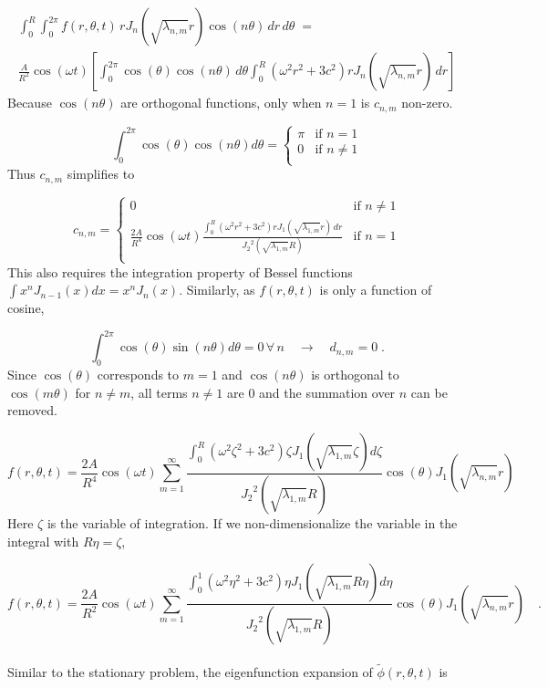 \documentclass{homework}
\begin{document}
\begin{multline*}
\int^R_0 \int^{2 \pi}_0 f(r, \theta , t) \, r J_n (\sqrt{\lambda_{n,m}} r) \cos(n \theta) \, dr \, d \theta \;=\\ \frac{A}{R^2} \cos(\omega t) \left[ \int^{2 \pi}_0 \cos(\theta) \cos(n \theta) \, d \theta \int^R_0 (\omega^2 r^2 + 3c^2)  r J_n (\sqrt{\lambda_{n,m}} r) \, d r \right]
\end{multline*}
\noindent
Because $\cos(n \theta)$ are orthogonal functions, only when $n = 1$ is $c_{n,m}$ non-zero.

\[ \int^{2 \pi}_0 \cos(\theta) \cos(n \theta) d \theta = 
\begin{cases}
      \pi & \text{if $n=1$}\\
      0 & \text{if $n \neq 1$}\\
    \end{cases}
\]
\noindent
Thus $c_{n,m}$ simplifies to 

\[ c_{n,m} = 
\begin{cases}
      0 & \text{if $n \neq 1$}\\
      \frac{2A}{R^4} \cos(\omega t) \frac{\int^R_0 (\omega^2 r^2 + 3c^2)  r J_1 (\sqrt{\lambda_{1,m}} r) \, d r}{{J_2}^2 (\sqrt{\lambda_{1,m}} R) } & \text{if $n = 1$}\\
    \end{cases}
\]
\noindent
This also requires the integration property of Bessel functions $\int x^n J_{n-1}(x) dx = x^n J_n(x)$. Similarly, as $f(r, \theta, t)$ is only a function of cosine, 

\[ \int^{2 \pi}_0 \cos(\theta) \sin(n \theta) d \theta = 0 \,\forall \, n \quad \rightarrow \quad d_{n,m} = 0 \; .\]
\newpage
\noindent
Since $\cos(\theta)$ corresponds to $m = 1$ and $\cos(n \theta)$ is orthogonal to $\cos(m \theta)$ for $ n \neq m$, all terms $n \neq 1$ are 0 and the summation over $n$ can be removed.

\[ f(r, \theta , t) = \frac{2A}{R^4} \cos(\omega t) \sum^\infty_{m=1} \frac{\int^R_0 (\omega^2 \zeta^2 + 3c^2)  \zeta J_1 (\sqrt{\lambda_{1,m}} \zeta) d \zeta}{{J_2}^2 (\sqrt{\lambda_{1,m}} R) } \cos(\theta) J_1(\sqrt{\lambda_{n,m}} r)\]
\noindent
Here $\zeta$ is the variable of integration. If we non-dimensionalize the variable in the integral with $R \eta = \zeta$,

\[ f(r, \theta , t) = \frac{2A}{R^2} \cos(\omega t) \sum^\infty_{m=1} \frac{\int^1_0 (\omega^2 \eta^2 + 3c^2)  \eta J_1 (\sqrt{\lambda_{1,m}} R \eta) d \eta}{{J_2}^2 (\sqrt{\lambda_{1,m}} R) } \cos(\theta) J_1(\sqrt{\lambda_{n,m}} r) \quad .\]
\\ \noindent
Similar to the stationary problem, the eigenfunction expansion of $\tilde{\phi}(r, \theta , t)$ is
\end{document}
